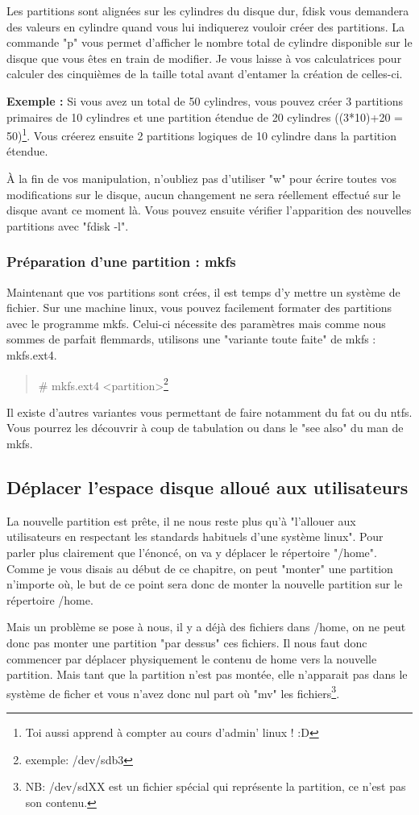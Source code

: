 \documentclass[a4paper,11pt]{article}
\newcommand{\commande}[1] {
    \begin{quote}
    \tt\raggedright #1 
    \end{quote}
}
\begin{document}
\par Les partitions sont alignées sur les cylindres du disque dur, fdisk vous demandera des valeurs en cylindre quand vous lui indiquerez vouloir créer des partitions. La commande "p" vous permet d'afficher le nombre total de cylindre disponible sur le disque que vous êtes en train de modifier. Je vous laisse à vos calculatrices pour calculer des cinquièmes de la taille total avant d'entamer la création de celles-ci.
\par \textbf{Exemple :} Si vous avez un total de 50 cylindres, vous pouvez créer 3 partitions primaires de 10 cylindres et une partition étendue de 20 cylindres ((3*10)+20 = 50)\footnote{Toi aussi apprend à compter au cours d'admin' linux ! :D}. Vous créerez ensuite 2 partitions logiques de 10 cylindre dans la partition étendue.
\par À la fin de vos manipulation, n'oubliez pas d'utiliser "w" pour écrire toutes vos modifications sur le disque, aucun changement ne sera réellement effectué sur le disque avant ce moment là. Vous pouvez ensuite vérifier l'apparition des nouvelles partitions avec "fdisk -l".

\subsubsection{Préparation d'une partition : mkfs}
\par Maintenant que vos partitions sont crées, il est temps d'y mettre un système de fichier. Sur une machine linux, vous pouvez facilement formater des partitions avec le programme mkfs. Celui-ci nécessite des paramètres mais comme nous sommes de parfait flemmards, utilisons une "variante toute faite" de mkfs : mkfs.ext4.
\commande{\# mkfs.ext4 <partition>\footnote{exemple: /dev/sdb3}}
\par Il existe d'autres variantes vous permettant de faire notamment du fat ou du ntfs. Vous pourrez les découvrir à coup de tabulation ou dans le "see also" du man de mkfs.

\subsection{Déplacer l'espace disque alloué aux utilisateurs}
\par La nouvelle partition est prête, il ne nous reste plus qu'à "l'allouer aux utilisateurs en respectant les standards habituels d'une système linux". Pour parler plus clairement que l'énoncé, on va y déplacer le répertoire "/home". Comme je vous disais au début de ce chapitre, on peut "monter" une partition n'importe où, le but de ce point sera donc de monter la nouvelle partition sur le répertoire /home.
\par Mais un problème se pose à nous, il y a déjà des fichiers dans /home, on ne peut donc pas monter une partition "par dessus" ces fichiers. Il nous faut donc commencer par déplacer physiquement le contenu de home vers la nouvelle partition. Mais tant que la partition n'est pas montée, elle n'apparait pas dans le système de ficher et vous n'avez donc nul part où "mv" les fichiers\footnote{NB: /dev/sdXX est un fichier spécial qui représente la partition, ce n'est pas son contenu.}.
\end{document}
